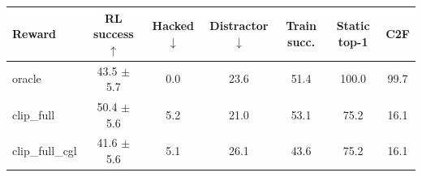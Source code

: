 \begin{tabular}{lcccccc}
\toprule
Reward & RL success $\uparrow$ & Hacked $\downarrow$ & Distractor $\downarrow$ & Train succ. & Static top-1 & C2F \\
\midrule
oracle & 43.5 $\pm$ 5.7 & 0.0 & 23.6 & 51.4 & 100.0 & 99.7 \\
clip\_full & 50.4 $\pm$ 5.6 & 5.2 & 21.0 & 53.1 & 75.2 & 16.1 \\
clip\_full\_cgl & 41.6 $\pm$ 5.6 & 5.1 & 26.1 & 43.6 & 75.2 & 16.1 \\
\bottomrule
\end{tabular}
